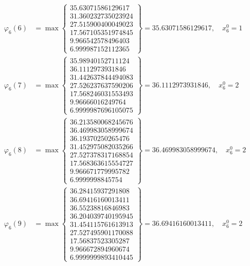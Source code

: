 \documentclass{article}
\begin{document}
\begin{align*}
  
\varphi_{6}(6) &= \max \left\{ \begin{array}{c}
35.63071586129617 \\
 31.360232735023924 \\
 27.515900400049023 \\
 17.567105351974845 \\
 9.966542578496403 \\
 6.999987152112365
\end{array} \right\} = 35.63071586129617, \quad x_{6}^0 = 1\\
  
  
  
  
\varphi_{6}(7) &= \max \left\{ \begin{array}{c}
35.98940152711124 \\
 36.1112973931846 \\
 31.442637844494083 \\
 27.526237637590206 \\
 17.568246031553493 \\
 9.96666016249764 \\
 6.9999987696105075
\end{array} \right\} = 36.1112973931846, \quad x_{6}^0 = 2\\
  
  
  
  
\varphi_{6}(8) &= \max \left\{ \begin{array}{c}
36.213580068245676 \\
 36.469983058999674 \\
 36.19370250265476 \\
 31.452975082035266 \\
 27.527378317168854 \\
 17.568363615554727 \\
 9.966671779995782 \\
 6.9999998845754
\end{array} \right\} = 36.469983058999674, \quad x_{6}^0 = 2\\
  
  
  
  
\varphi_{6}(9) &= \max \left\{ \begin{array}{c}
36.28415937291808 \\
 36.69416160013411 \\
 36.55238816846983 \\
 36.204039740195945 \\
 31.454115761613913 \\
 27.527495901170088 \\
 17.56837523305287 \\
 9.966672894960674 \\
 6.9999999893410445
\end{array} \right\} = 36.69416160013411, \quad x_{6}^0 = 2\\
  

\end{align*}
\end{document}
